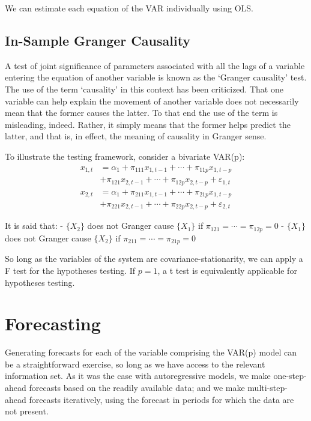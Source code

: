 \documentclass[
  12pt,
  oneside]{book}
\begin{document}
We can estimate each equation of the VAR individually using OLS.

\hypertarget{in-sample-granger-causality}{%
\subsection{In-Sample Granger Causality}\label{in-sample-granger-causality}}

A test of joint significance of parameters associated with all the lags of a variable entering the equation of another variable is known as the `Granger causality' test. The use of the term `causality' in this context has been criticized. That one variable can help explain the movement of another variable does not necessarily mean that the former causes the latter. To that end the use of the term is misleading, indeed. Rather, it simply means that the former helps predict the latter, and that is, in effect, the meaning of causality in Granger sense.

To illustrate the testing framework, consider a bivariate VAR(p):
\[\begin{aligned}
x_{1,t} &= \alpha_1 + \pi_{111} x_{1,t-1} + \cdots + \pi_{11p} x_{1,t-p} \\
&+ \pi_{121} x_{2,t-1} + \cdots + \pi_{12p} x_{2,t-p} +\varepsilon_{1,t}  \\
x_{2,t} &= \alpha_1 + \pi_{211} x_{1,t-1} + \cdots + \pi_{21p} x_{1,t-p} \\
&+ \pi_{221} x_{2,t-1} + \cdots + \pi_{22p} x_{2,t-p} +\varepsilon_{2,t} 
\end{aligned}\]

It is said that:
- \(\{X_2\}\) does not Granger cause \(\{X_1\}\) if \(\pi_{121}=\cdots=\pi_{12p}=0\)
- \(\{X_1\}\) does not Granger cause \(\{X_2\}\) if \(\pi_{211}=\cdots=\pi_{21p}=0\)

So long as the variables of the system are covariance-stationarity, we can apply a F test for the hypotheses testing. If \(p=1\), a t test is equivalently applicable for hypotheses testing.

\hypertarget{forecasting-2}{%
\section{Forecasting}\label{forecasting-2}}

Generating forecasts for each of the variable comprising the VAR(p) model can be a straightforward exercise, so long as we have access to the relevant information set. As it was the case with autoregressive models, we make one-step-ahead forecasts based on the readily available data; and we make multi-step-ahead forecasts iteratively, using the forecast in periods for which the data are not present.
\end{document}
